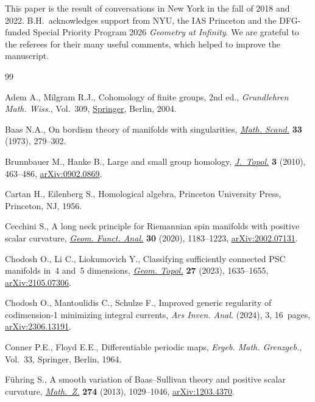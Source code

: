 \documentclass[pdftex]{sigma}
\numberwithin{equation}{section}
\begin{document}
This paper is the result of conversations in New York in the fall of 2018 and 2022.
B.H.~acknowledges support from NYU, the IAS Princeton and the DFG-funded Special Priority Program 2026 {\em Geometry at Infinity}.
We are grateful to the referees for their many useful comments, which helped to improve the manuscript.

\begin{thebibliography}{99}
\footnotesize\itemsep=0pt

Adem A., Milgram R.J., Cohomology of finite groups, 2nd ed., \textit{Grundlehren Math.
 Wiss.}, Vol.~309, \href{https://doi.org/10.1007/978-3-662-06280-7}{Springer}, Berlin, 2004.

Baas N.A., On bordism theory of manifolds with singularities, \href{https://doi.org/10.7146/math.scand.a-11491}{\textit{Math.
 Scand.}} \textbf{33} (1973), 279--302.

Brunnbauer M., Hanke B., Large and small group homology, \href{https://doi.org/10.1112/jtopol/jtq014}{\textit{J.~Topol.}}
 \textbf{3} (2010), 463--486, \href{https://arxiv.org/abs/0902.0869}{arXiv:0902.0869}.

Cartan H., Eilenberg S., Homological algebra, Princeton University Press,
 Princeton, NJ, 1956.

Cecchini S., A long neck principle for {R}iemannian spin manifolds with
 positive scalar curvature, \href{https://doi.org/10.1007/s00039-020-00545-1}{\textit{Geom. Funct. Anal.}} \textbf{30} (2020),
 1183--1223, \href{https://arxiv.org/abs/2002.07131}{arXiv:2002.07131}.

Chodosh O., Li C., Liokumovich Y., Classifying sufficiently connected {PSC}
 manifolds in~4 and~5 dimensions,  \href{https://doi.org/10.2140/gt.2023.27.1635}{\textit{Geom. Topol.}} \textbf{27} (2023),
 1635--1655, \href{https://arxiv.org/abs/2105.07306}{arXiv:2105.07306}.

Chodosh O., Mantoulidis C., Schulze F., Improved generic regularity of
 codimension-1 minimizing integral currents, \textit{Ars Inven. Anal.}
 (2024), 3, 16~pages, \href{https://arxiv.org/abs/2306.13191}{arXiv:2306.13191}.

Conner P.E., Floyd E.E., Differentiable periodic maps, \textit{Ergeb. Math.
 Grenzgeb.}, Vol.~33, Springer, Berlin, 1964.

F\"uhring S., A smooth variation of {B}aas--{S}ullivan theory and positive
 scalar curvature, \href{https://doi.org/10.1007/s00209-012-1105-x}{\textit{Math.~Z.}} \textbf{274} (2013), 1029--1046,
 \href{https://arxiv.org/abs/1203.4370}{arXiv:1203.4370}.


\end{thebibliography}
\end{document}

